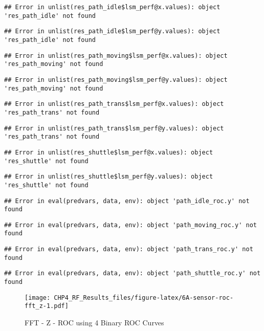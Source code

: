 \documentclass[]{article}
\begin{document}
\begin{verbatim}
## Error in unlist(res_path_idle$lsm_perf@x.values): object 'res_path_idle' not found
\end{verbatim}

\begin{verbatim}
## Error in unlist(res_path_idle$lsm_perf@y.values): object 'res_path_idle' not found
\end{verbatim}

\begin{verbatim}
## Error in unlist(res_path_moving$lsm_perf@x.values): object 'res_path_moving' not found
\end{verbatim}

\begin{verbatim}
## Error in unlist(res_path_moving$lsm_perf@y.values): object 'res_path_moving' not found
\end{verbatim}

\begin{verbatim}
## Error in unlist(res_path_trans$lsm_perf@x.values): object 'res_path_trans' not found
\end{verbatim}

\begin{verbatim}
## Error in unlist(res_path_trans$lsm_perf@y.values): object 'res_path_trans' not found
\end{verbatim}

\begin{verbatim}
## Error in unlist(res_shuttle$lsm_perf@x.values): object 'res_shuttle' not found
\end{verbatim}

\begin{verbatim}
## Error in unlist(res_shuttle$lsm_perf@y.values): object 'res_shuttle' not found
\end{verbatim}

\begin{verbatim}
## Error in eval(predvars, data, env): object 'path_idle_roc.y' not found
\end{verbatim}

\begin{verbatim}
## Error in eval(predvars, data, env): object 'path_moving_roc.y' not found
\end{verbatim}

\begin{verbatim}
## Error in eval(predvars, data, env): object 'path_trans_roc.y' not found
\end{verbatim}

\begin{verbatim}
## Error in eval(predvars, data, env): object 'path_shuttle_roc.y' not found
\end{verbatim}

\begin{figure}
\centering
\texttt{[image: CHP4\_RF\_Results\_files/figure-latex/6A-sensor-roc-fft\_z-1.pdf]}
\caption{FFT - Z - ROC using 4 Binary ROC Curves}
\end{figure}
\end{document}
